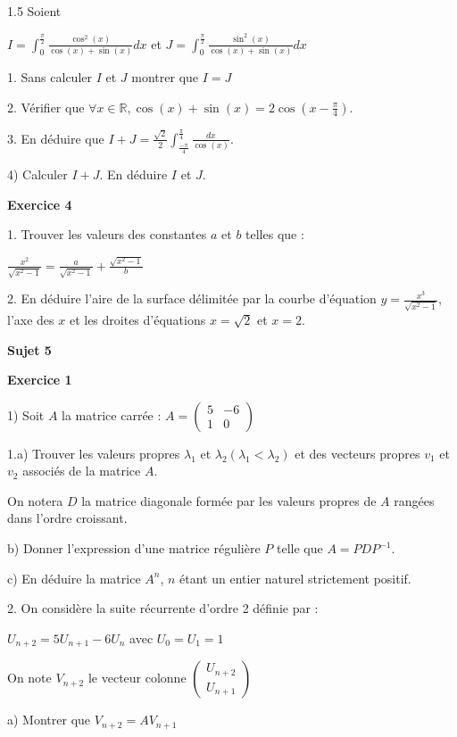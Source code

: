 \documentclass[12pt]{article}
\begin{document}
\begin{spacing}{1.5}
  Soient
 
 $I = \int_{0}^{\frac{\pi}{2}}\frac{\cos^2(x)}{\cos(x) + \sin(x)}dx$ et $J = \int_{0}^{\frac{\pi}{2}}\frac{\sin^2(x)}{\cos(x) + \sin(x)}dx$ 

 1. Sans calculer $I$ et $J$ montrer que $I = J$
 
 2. Vérifier que $\forall {x\in \mathbb{R}}, \cos(x)+\sin(x) = 2\cos(x-\frac{\pi}{4})$.
 
 3. En déduire que $I+J = \frac{\sqrt{2}}{2}\int_{\frac{-\pi}{4}}^{\frac{\pi}{4}}\frac{dx}{\cos(x)}$.
 
 4) Calculer $I + J$. En déduire $I$ et $J$.
 
 \textbf{Exercice 4 }
 
  1. Trouver les valeurs des constantes $a$ et $b$ telles que :

$\frac{x^2}{\sqrt{x^2-1}}=\frac{a}{\sqrt{x^2-1}} + \frac{\sqrt{x^2-1}}{b}$

 2. En déduire l'aire de la surface délimitée par la courbe d'équation $y = \frac{x^3}{\sqrt{x^2-1}}$, l'axe des $x$ et les droites d'équations $x = \sqrt{2}$ et $x = 2$.
 
 
 \quad
 \quad
 \textbf{Sujet 5}
 
 \textbf{Exercice 1}
 
 1) Soit $A$ la matrice carrée : 
$A = \begin{pmatrix}
5 & -6 \\
1 & 0
\end{pmatrix}$

 1.a) Trouver les valeurs propres $\lambda_1$ et $\lambda_2 (\lambda_1 < \lambda_2)$ et des vecteurs propres $v_1$ et $v_2$ associés de la matrice $A$.  

On notera $D$ la matrice diagonale formée par les valeurs propres de $A$ rangées dans 
l'ordre croissant. 

b) Donner l'expression d'une matrice régulière $P$ telle que $A = PDP^{-1}$.

c) En déduire la matrice $A^n$, $n$ étant un entier naturel strictement positif. 

2. On considère la suite récurrente d'ordre 2 définie par : 

$U_{n+2} = 5U_{n+1}-6U_n$
avec $U_0 = U_1 = 1$

On note $V_{n+2}$ le vecteur colonne $\begin{pmatrix}
U_{n+2} \\ 
U_{n+1}
\end{pmatrix} $

a) Montrer que $V_{n+2} = AV_{n+1}$


\end{spacing}
\end{document}

